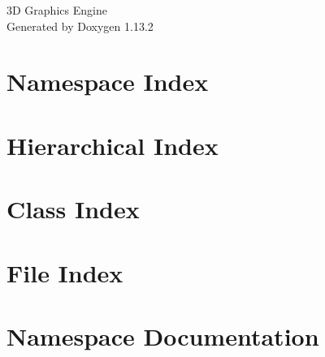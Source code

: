 \documentclass[twoside]{book}
\newcommand{\+}{\discretionary{\mbox{\scriptsize$\hookleftarrow$}}{}{}}
\newcommand{\clearemptydoublepage}{%
    \newpage{\pagestyle{empty}\cleardoublepage}%
  }
\begin{document}
  \raggedbottom
    \hypersetup{pageanchor=false,
                bookmarksnumbered=true,
                pdfencoding=unicode
               }
  \begin{titlepage}
  \vspace*{7cm}
  \begin{center}%
  {\Large 3\+D Graphics Engine}\\
  \vspace*{1cm}
  {\large Generated by Doxygen 1.13.2}\\
  \end{center}
  \end{titlepage}
  \clearemptydoublepage
  \tableofcontents
  \clearemptydoublepage
  \hypersetup{pageanchor=true}

\chapter{Namespace Index}

\chapter{Hierarchical Index}

\chapter{Class Index}

\chapter{File Index}

\chapter{Namespace Documentation}



\end{document}
